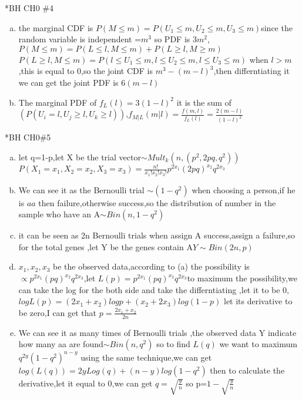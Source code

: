 \documentclass{article}
\begin{document}
\begin{homeworkProblem}*{BH CH0 \#4}
\begin{enumerate}[(a)]
\item the marginal CDF is $P(M\leq m)=P(U_1\leq m,U_2\leq m,U_3\leq m)$since the random variable is independent =$m^{3}$ so PDF is $3m^2$,$P(M\leq m)=P(L\leq l,M\leq m)+P(L\geq l,M\geq m)$ $P(L\geq l,M\leq m)=P(l\leq U_1\leq m,l\leq U_2\leq m,l\leq U_3\leq m)$ when $l>m$,this is equal to 0,so the joint CDF is $m^{3}-(m-l)^{3}$,then differntiating it we can get the joint PDF is $6(m-l)$
\item The marginal PDF of $f_{L}(l)=3(1-l)^2$ it is the sum of $(P(U_i=l,U_j\geq l,U_k\geq l))$,$f_{M|L}(m|l)=\frac{f(m,l)}{f_{L}(l)}=\frac{2(m-l)}{(1-l)^2}$
\end{enumerate}
\end{homeworkProblem}
\begin{homeworkProblem}*{BH CH0\#5}
    \begin{enumerate}[(a)]
        \item let q=1-p,let X be the trial vector$\sim Mult_{k}(n,(p^2,2pq,q^2)) $ $P(X_1=x_1,X_2=x_2,X_3=x_3)=\frac{n!}{x_1!x_2!x_3!}p^{2x_1}(2pq)^{x_2}q^{2x_3}$
        \item We can see it as the Bernoulli trial $\sim(1-q^2)$ when choosing a person,if he is $aa$ then failure,otherwise success,so the distribution of number in the sample who have an A$\sim Bin(n,1-q^2)$
        \item  it can be seen as 2n Bernoulli trials when assign A success,assign a failure,so for the total genes ,let Y be the genes contain A$Y\sim Bin(2n,p)$
        \item $x_1,x_2,x_3$ be the observed data,according to (a) the possibility is $\propto p^{2x_1}(pq)^{x_2}q^{2x_3}$,let $L(p)=p^{2x_1}(pq)^{x_2}q^{2x_3}$to maximum the possibility,we can take the log for the both side and take the differntiating ,let it to be 0,$logL(p)=(2x_1+x_2)logp+(x_2+2x_3)log(1-p)$ let its derivative to be zero,I can get that $p=\frac{2x_1+x_2}{2n}$
        \item  We can see it as many times of Bernoulli trials ,the observed data Y indicate how many aa are found$\sim Bin(n,q^2)$ so to find $L(q)$ we want to maximum$q^{2y}(1-q^2)^{n-y}$ using the same technique,we can get $log(L(q))=2yLog(q)+(n-y)log(1-q^2)$ then to calculate the derivative,let it equal to 0,we can get $q=\sqrt{\frac{y}{n}}$ so p=$1-\sqrt{\frac{y}{n}}$
    \end{enumerate}
\end{homeworkProblem}
\end{document}
